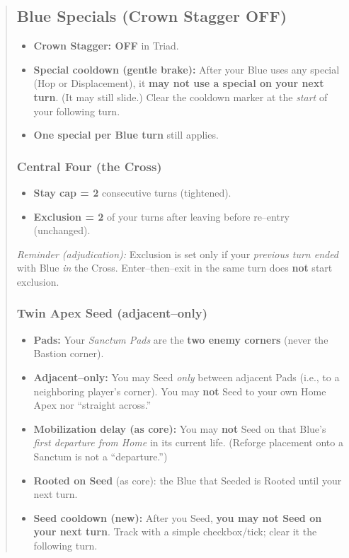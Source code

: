\documentclass[11pt]{article}
\begin{document}
\begin{quote}
\subsection*{Blue Specials (Crown Stagger OFF)}
\begin{itemize}[leftmargin=1.3em,itemsep=0.25em]
  \item \textbf{Crown Stagger: OFF} in Triad.
  \item \textbf{Special cooldown (gentle brake):} After your Blue uses any special (Hop or Displacement), it \textbf{may not use a special on your next turn}. (It may still slide.) Clear the cooldown marker at the \emph{start} of your following turn.
  \item \textbf{One special per Blue turn} still applies.
\end{itemize}

\subsubsection*{Central Four (the Cross)}
\begin{itemize}[leftmargin=1.3em,itemsep=0.2em]
  \item \textbf{Stay cap = 2} consecutive turns (tightened).
  \item \textbf{Exclusion = 2} of your turns after leaving before re–entry (unchanged).
\end{itemize}
\noindent\emph{Reminder (adjudication):} Exclusion is set only if your \emph{previous turn ended} with Blue \emph{in} the Cross. Enter–then–exit in the same turn does \textbf{not} start exclusion.

\subsubsection*{Twin Apex Seed (adjacent–only)}
\begin{itemize}[leftmargin=1.3em,itemsep=0.25em]
  \item \textbf{Pads:} Your \emph{Sanctum Pads} are the \textbf{two enemy corners} (never the Bastion corner).
  \item \textbf{Adjacent–only:} You may Seed \emph{only} between adjacent Pads (i.e., to a neighboring player’s corner). You may \textbf{not} Seed to your own Home Apex nor “straight across.”
  \item \textbf{Mobilization delay (as core):} You may \textbf{not} Seed on that Blue’s \emph{first departure from Home} in its current life. (Reforge placement onto a Sanctum is not a “departure.”)
  \item \textbf{Rooted on Seed} (as core): the Blue that Seeded is Rooted until your next turn.
  \item \textbf{Seed cooldown (new):} After you Seed, \textbf{you may not Seed on your next turn}. Track with a simple checkbox/tick; clear it the following turn.
\end{itemize}


\end{quote}
\end{document}
